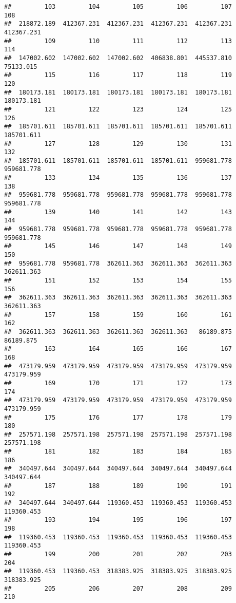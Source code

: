 \documentclass[
]{book}
\begin{document}
\begin{verbatim}
##         103         104         105         106         107         108 
##  218872.189  412367.231  412367.231  412367.231  412367.231  412367.231 
##         109         110         111         112         113         114 
##  147002.602  147002.602  147002.602  406838.801  445537.810   75133.015 
##         115         116         117         118         119         120 
##  180173.181  180173.181  180173.181  180173.181  180173.181  180173.181 
##         121         122         123         124         125         126 
##  185701.611  185701.611  185701.611  185701.611  185701.611  185701.611 
##         127         128         129         130         131         132 
##  185701.611  185701.611  185701.611  185701.611  959681.778  959681.778 
##         133         134         135         136         137         138 
##  959681.778  959681.778  959681.778  959681.778  959681.778  959681.778 
##         139         140         141         142         143         144 
##  959681.778  959681.778  959681.778  959681.778  959681.778  959681.778 
##         145         146         147         148         149         150 
##  959681.778  959681.778  362611.363  362611.363  362611.363  362611.363 
##         151         152         153         154         155         156 
##  362611.363  362611.363  362611.363  362611.363  362611.363  362611.363 
##         157         158         159         160         161         162 
##  362611.363  362611.363  362611.363  362611.363   86189.875   86189.875 
##         163         164         165         166         167         168 
##  473179.959  473179.959  473179.959  473179.959  473179.959  473179.959 
##         169         170         171         172         173         174 
##  473179.959  473179.959  473179.959  473179.959  473179.959  473179.959 
##         175         176         177         178         179         180 
##  257571.198  257571.198  257571.198  257571.198  257571.198  257571.198 
##         181         182         183         184         185         186 
##  340497.644  340497.644  340497.644  340497.644  340497.644  340497.644 
##         187         188         189         190         191         192 
##  340497.644  340497.644  119360.453  119360.453  119360.453  119360.453 
##         193         194         195         196         197         198 
##  119360.453  119360.453  119360.453  119360.453  119360.453  119360.453 
##         199         200         201         202         203         204 
##  119360.453  119360.453  318383.925  318383.925  318383.925  318383.925 
##         205         206         207         208         209         210 

\end{verbatim}
\end{document}
